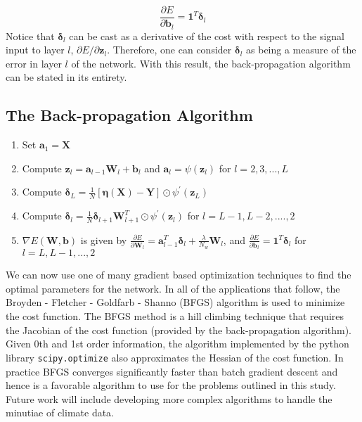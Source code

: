 \begin{equation}
\frac{\partial E}{\partial \textbf{b}_{l}} = \textbf{1}^T
\boldsymbol{\delta}_{l}
\end{equation}
Notice that $\boldsymbol{\delta}_l$ can be cast as a derivative of the cost with respect to the signal input to layer $l$, $\partial E/ \partial \textbf{z}_{l}$. Therefore, one can consider $\boldsymbol{\delta}_{l}$ as being a measure of the error in layer $l$ of the network. With this result, the back-propagation algorithm can be stated in its entirety.
\subsection{The Back-propagation Algorithm}
\label{backprop}
\begin{enumerate}[topsep=0pt,itemsep=0ex,partopsep=1ex,parsep=1ex]
\item Set $\textbf{a}_1 = \textbf{X}$
\item Compute $\textbf{z}_l = \textbf{a}_{l - 1}\textbf{W}_l + \textbf{b}_l$ and $\textbf{a}_l = \psi(\textbf{z}_l)$ for $l=2,3,...,L$
\item Compute $\boldsymbol{\delta}_L = \frac{1}{N} \left[\boldsymbol{\eta}(\textbf{X}) - \textbf{Y}\right] \odot \psi^{\prime}(\textbf{z}_{L})$
\item Compute $\boldsymbol{\delta}_{l} = \frac{1}{N} \boldsymbol{\delta}_{l + 1} \textbf{W}^T_{l + 1} \odot \psi^{\prime}(\textbf{z}_{l})$ for $l=L - 1, L - 2, ...., 2$
\item $\nabla E(\textbf{W}, \textbf{b})$ is given by $\frac{\partial E}{\partial \textbf{W}_{l}} = \textbf{a}^T_{l - 1} \boldsymbol{\delta}_{l} + \frac{\lambda}{N_w}\textbf{W}_{l}$, and $\frac{\partial E}{\partial \textbf{b}_{l}} = \textbf{1}^T \boldsymbol{\delta}_{l}$ for $l = L, L - 1, ..., 2$
\end{enumerate}

\noindent We can now use one of many gradient based optimization techniques to find the optimal parameters for the network. In all of the applications that follow, the Broyden - Fletcher - Goldfarb - Shanno (BFGS) algorithm is used to minimize the cost function. The BFGS method is a hill climbing technique that requires the Jacobian of the cost function (provided by the back-propagation algorithm). Given 0th and 1st order information, the algorithm implemented by the python library \texttt{scipy.optimize} also approximates the Hessian of the cost function. In practice BFGS converges significantly faster than batch gradient descent and hence is a favorable algorithm to use for the problems outlined in this study. Future work will include developing more complex algorithms to handle the minutiae of climate data.
